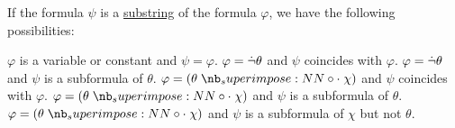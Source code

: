 \begin{lemma}\label{thm:propositional_subformula_lemma}
  If the formula \( \psi \) is a \hyperref[def:formal_language/subword]{substring} of the formula \( \varphi \), we have the following possibilities:
  \begin{thmenum}
     \( \varphi \) is a variable or constant and \( \psi = \varphi \).
     \( \varphi = \dot\neg \theta \) and \( \psi \) coincides with \( \varphi \).
     \( \varphi = \dot\neg \theta \) and \( \psi \) is a subformula of \( \theta \).
     \( \varphi = (\theta \syncirc \chi) \) and \( \psi \) coincides with \( \varphi \).
     \( \varphi = (\theta \syncirc \chi) \) and \( \psi \) is a subformula of \( \theta \).
     \( \varphi = (\theta \syncirc \chi) \) and \( \psi \) is a subformula of \( \chi \) but not \( \theta \).
  \end{thmenum}
\end{lemma}
